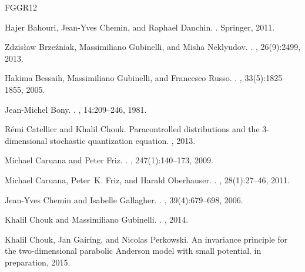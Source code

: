 \documentclass[a4paper,11pt]{article}
\theoremstyle{remark}
\begin{document}
\begin{thebibliography}{FGGR12}

Hajer Bahouri, Jean-Yves Chemin, and Raphael Danchin.
.
\newblock Springer, 2011.

Zdzis{\l}aw Brze{\'z}niak, Massimiliano Gubinelli, and Misha Neklyudov.
.
, 26(9):2499, 2013.

Hakima Bessaih, Massimiliano Gubinelli, and Francesco Russo.
.
, 33(5):1825--1855, 2005.

Jean-Michel Bony.
.
, 14:209--246, 1981.

R{\'e}mi Catellier and Khalil Chouk.
\newblock Paracontrolled distributions and the 3-dimensional stochastic
  quantization equation.
, 2013.

Michael Caruana and Peter Friz.
.
, 247(1):140--173, 2009.

Michael Caruana, Peter~K. Friz, and Harald Oberhauser.
.
, 28(1):27--46,
  2011.

Jean-Yves Chemin and Isabelle Gallagher.
.
, 39(4):679--698, 2006.

Khalil Chouk and Massimiliano Gubinelli.
.
, 2014.

Khalil Chouk, Jan Gairing, and Nicolas Perkowski.
\newblock An invariance principle for the two-dimensional parabolic Anderson model with small potential.
\newblock in preparation, 2015.


\end{thebibliography}
\end{document}
